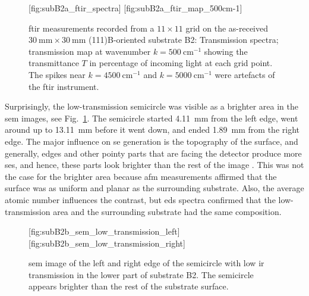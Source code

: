 \begin{figure}[htbp]
    \centering
    [fig:subB2a_ftir_spectra]
    \hfill
    [fig:subB2a_ftir_map_500cm-1]
    \caption[\Ac{ftir} measurements of the as-received substrate B2.]{\Ac{ftir} measurements recorded from a $11\times11$ grid on the as-received $\SI{30}{\milli\metre}\times\SI{30}{\milli\metre}$ (111)B-oriented substrate B2:  Transmission spectra;  transmission map at wavenumber $k=\SI{500}{\centi\metre^{-1}}$ showing the transmittance $T$ in percentage of incoming light at each grid point. The spikes near $k=\SI{4500}{\centi\metre^{-1}}$ and $k=\SI{5000}{\centi\metre^{-1}}$ were artefacts of the \ac{ftir} instrument.}
\end{figure}

Surprisingly, the low-transmission semicircle was visible as a brighter area in the \ac{sem} images, see Fig.~\ref{fig:subB2b_sem_low_transmission}. The semicircle started \SI{4.11}{\milli\metre} from the left edge, went around up to \SI{13.11}{\milli\metre} before it went down, and ended \SI{1.89}{\milli\metre} from the right edge. The major influence on \ac{se} generation is the topography of the surface, and generally, edges and other pointy parts that are facing the detector produce more \acp{se}, and hence, these parts look brighter than the rest of the image \citep{goldstein2012scanning}. This was not the case for the brighter area because \ac{afm} measurements affirmed that the surface was as uniform and planar as the surrounding substrate. Also, the average atomic number influences the contrast, but \ac{eds} spectra confirmed that the low-transmission area and the surrounding substrate had the same composition.

\begin{figure}[htbp]
    \centering
    [fig:subB2b_sem_low_transmission_left]
    \hfill
    [fig:subB2b_sem_low_transmission_right]
    \caption[\Ac{sem} image of the semicircle with low \ac{ir} transmission on substrate B2.]{\Ac{sem} image of the  left and  right edge of the semicircle with low \ac{ir} transmission in the lower part of substrate B2. The semicircle appears brighter than the rest of the substrate surface.}\label{fig:subB2b_sem_low_transmission}
\end{figure}

